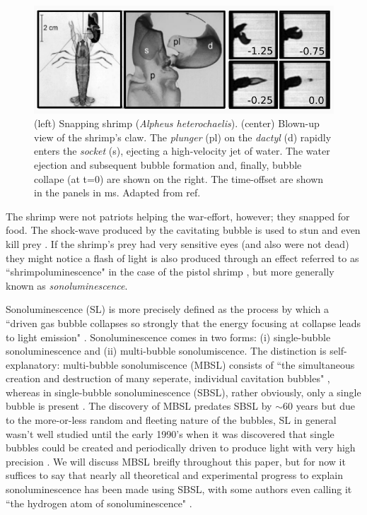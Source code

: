 \documentclass[rmp,aps,nofootinbib,superscriptaddress,floatfix]{revtex4-2}
\begin{document}
\begin{figure}
\includegraphics[width=0.9\linewidth]{figs/shrimp_claw.pdf}
    \caption{(left) Snapping shrimp (\emph{Alpheus heterochaelis}). (center) Blown-up view of the shrimp's claw. The \emph{plunger} (pl) on the \emph{dactyl} (d) rapidly enters the \emph{socket} (s), ejecting a high-velocity jet of water. The water ejection and subsequent bubble formation and, finally, bubble collape (at t=0) are shown on the right. The time-offset are shown in the panels in ms. Adapted from ref. \cite{versluis2000snapping}}
\label{fig:shrimp_claw}
\end{figure}

The shrimp were not patriots helping the war-effort, however; they snapped for food. The shock-wave produced by the cavitating bubble is used to stun and even kill prey \cite{versluis2000snapping}. If the shrimp's prey had very sensitive eyes (and also were not dead) they might notice a flash of light is also produced through an effect referred to as ``shrimpoluminescence" in the case of the pistol shrimp \cite{lohse2001snapping}, but more generally known as \emph{sonoluminescence}.

Sonoluminescence (SL) is more precisely defined as the process by which a ``driven gas bubble collapses so strongly that the energy focusing at collapse leads to light emission" \cite{brenner2002single}. Sonoluminescence comes in two forms: (i) single-bubble sonoluminescence and (ii) multi-bubble sonolumiscence. The distinction is self-explanatory: multi-bubble sonolumiscence (MBSL) consists of  ``the simultaneous creation and destruction of many seperate, individual cavitation bubbles" \cite{crum1994sonoluminescence,brenner2002single}, whereas in single-bubble sonoluminescence (SBSL), rather obviously, only a single bubble is present \cite{gaitan1992sonoluminescence}. The discovery of MBSL predates SBSL by $\sim$60 years but due to the more-or-less random and fleeting nature of the bubbles, SL in general wasn't well studied until the early 1990's when it was discovered that single bubbles could be created and periodically driven to produce light with very high precision \cite{crum1994sonoluminescence,gaitan1990experimental,gaitan1992sonoluminescence,brenner2002single}. We will discuss MBSL breifly throughout this paper, but for now it suffices to say that nearly all theoretical and experimental progress to explain sonoluminescence has been made using SBSL, with some authors even calling it ``the hydrogen atom of sonoluminescence" \cite{lohse2018bubble,crum1994sonoluminescence}.
\end{document}
